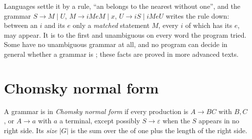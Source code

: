 Languages settle it by a rule, ``an  belongs to the nearest  without one'', and the grammar
$S \to M \mid U$, $M \to iMeM \mid x$, $U \to iS \mid iMeU$ writes the rule down: between an $i$ and its $e$ only a
\emph{matched} statement $M$, every $i$ of which has its $e$, may appear. It is  to the first and
unambiguous on every word the program tried. Some  have no unambiguous grammar at all, and no
program can decide in general whether a grammar is ; these facts are proved in more advanced texts.

\section{Chomsky normal form}\label{sec:b2:context-free-languages:cnf}

\begin{definition}\label{def:b2:context-free-languages:cnf}
A grammar is in \emph{Chomsky normal form} if every production is $A \to BC$ with $B, C$
, or $A \to a$ with $a$ a terminal, except possibly $S \to \varepsilon$ when the  $S$ appears in
no right side. Its \emph{size} $|G|$ is the sum over the  of one plus the length of the right side.
\end{definition}


